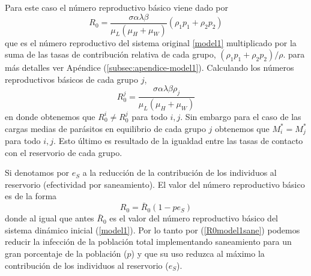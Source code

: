 \documentclass[12pt,a4paper]{article}
\theoremstyle{plain}%
\theoremstyle{definition}
\theoremstyle{remark}
\begin{document}
	Para este caso el número reproductivo básico viene dado por 
	\begin{equation}
	R_0=\frac{\sigma \alpha \lambda \beta}{ \mu_L (\mu_H+\mu_W)} (\rho_1 p_1 + \rho_2 p_2)
	\end{equation}
	que es el número reproductivo del sistema original \eqref{model1} multiplicado por la suma de las tasas de contribución relativa de cada grupo, $(\rho_1 p_1 + \rho_2 p_2)/\rho$. 
	para más detalles ver Apéndice (\ref{subsec:apendice-model1}).
	Calculando los números reproductivos básicos de cada grupo $j$, 
	\begin{equation}
	R_{0}^j=\frac{ \sigma \alpha \lambda \beta \rho_j}{\mu_L(\mu_{H}+\mu_W)} %
	\end{equation}
	en donde obtenemos que $R_{0}^i\neq R_{0}^j$ para todo $i,j$. 
	Sin embargo  para el caso de las cargas medias de parásitos en equilibrio de cada grupo $j$ obtenemos que $M_i^*= M_j^*$ para todo $i,j$.
	Esto último es resultado de  la igualdad entre las tasas de contacto con el reservorio de cada grupo.
	
	Si denotamos por $e_S$ a la 
	reducción de la contribución de los individuos al reservorio (efectividad por saneamiento).  El valor del número reproductivo básico es de la forma  
	\begin{equation}\label{R0model1sane}
	R_0=\bar R_0  (1- p e_S)
	\end{equation}	
	donde al igual que antes $\bar R_0$ es el valor del número reproductivo básico del sistema dinámico inicial (\ref{model1}). 
	{%
	Por lo tanto por  (\ref{R0model1sane}) podemos 
reducir la infección %
	de la población total implementando saneamiento %
	para un gran porcentaje de la población ($p$) y que su uso reduzca al máximo la contribución de los individuos al reservorio ($e_{S}$).
	}
	
\end{document}
